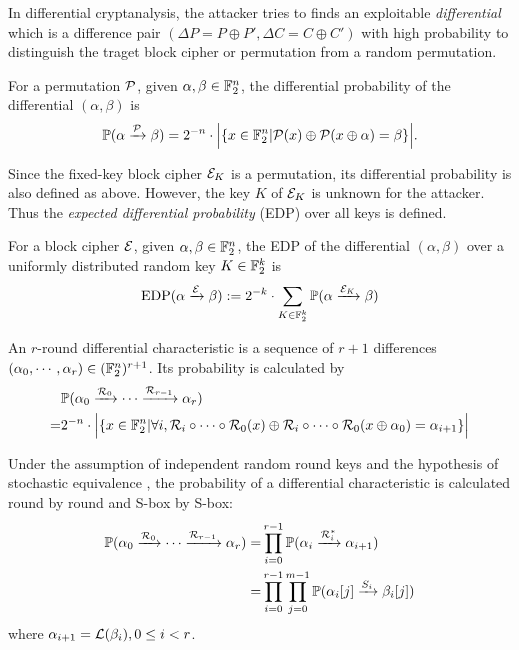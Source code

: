 In differential cryptanalysis, the attacker tries to finds an exploitable \textit{differential} which is a difference pair $(\Delta P=P\oplus P',\Delta C=C\oplus C')$ with high probability to distinguish the traget block cipher or permutation from a random permutation. 

\begin{definition}
    For a permutation $\mathcal{P}$, given $\alpha,\beta\in \mathbb{F}_2^n$, the differential probability of the differential $(\alpha,\beta)$ is
    \begin{align*}
        \mathbb{P}(\alpha\xrightarrow{\mathcal{P}}\beta)=2^{-n}\cdot\Big|\{x\in\mathbb{F}_2^n|\mathcal{P}(x)\oplus\mathcal{P}(x\oplus\alpha)=\beta\}\Big|.
    \end{align*}
\end{definition}

Since the fixed-key block cipher $\mathcal{E}_K$ is a permutation, its differential probability is also defined as above. However, the key $K$ of $\mathcal{E}_K$ is unknown for the attacker. Thus the \textit{expected differential probability} (EDP) over all keys is defined.

\begin{definition}
    For a block cipher $\mathcal{E}$, given $\alpha,\beta\in \mathbb{F}_2^n$, the EDP of the differential $(\alpha,\beta)$ over a uniformly distributed random key $K\in \mathbb{F}_2^k$ is 
    \begin{align*}
        \text{EDP}(\alpha\xrightarrow{\mathcal{E}}\beta):=2^{-k}\cdot\sum\limits_{K\in \mathbb{F}_2^k}\mathbb{P}(\alpha\xrightarrow{\mathcal{E}_K}\beta)
    \end{align*}
\end{definition}

\begin{definition}
    An $r$-round differential characteristic is a sequence of $r+1$ differences $(\alpha_0,\cdots,\alpha_r)\in(\mathbb{F}_2^n)^{r+1}$. Its probability is calculated by
    \begin{align*}
        &\mathbb{P}(\alpha_0\xrightarrow{\mathcal{R}_0}\cdots\xrightarrow{\mathcal{R}_{r-1}}\alpha_r)\\
        =&2^{-n}\cdot\Big|\{x\in\mathbb{F}_2^n|\forall i, \mathcal{R}_i\circ\cdots\circ\mathcal{R}_0(x)\oplus\mathcal{R}_i\circ\cdots\circ\mathcal{R}_0(x\oplus\alpha_0)=\alpha_{i+1}\}\Big|\\
    \end{align*}
\end{definition}

Under the assumption of independent random round keys and the hypothesis of stochastic equivalence \cite{lai1991markov}, the probability of a differential characteristic is calculated round by round and S-box by S-box:
\begin{align*}
    \mathbb{P}(\alpha_0\xrightarrow{\mathcal{R}_0}\cdots\xrightarrow{\mathcal{R}_{r-1}}\alpha_r)
    =&\prod\limits_{i=0}^{r-1}\mathbb{P}(\alpha_i\xrightarrow{\mathcal{R}_i^*}\alpha_{i+1})\\
    =&\prod\limits_{i=0}^{r-1}\prod\limits_{j=0}^{m-1}\mathbb{P}(\alpha_i[j]\xrightarrow{S_i}\beta_i[j])
\end{align*}
where $\alpha_{i+1}=\mathcal{L}(\beta_i),0\leq i<r$. 

